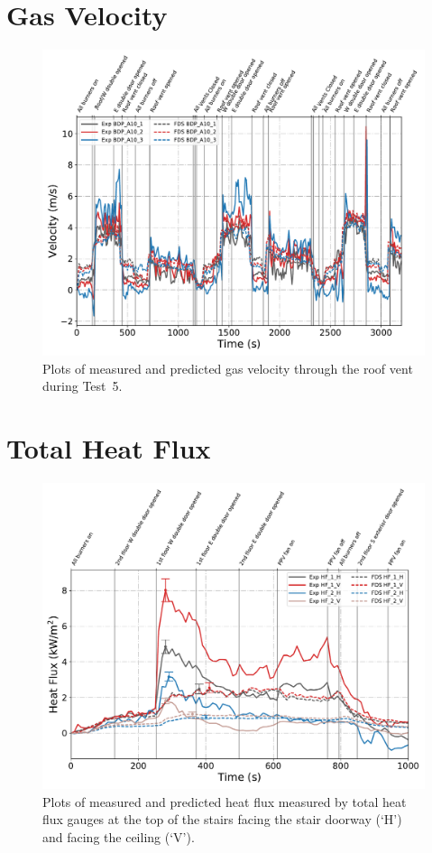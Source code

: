 \clearpage
\section{Gas Velocity}
\begin{figure}[!h]
	\centering
	\includegraphics[width=\columnwidth]{Figures/Plots/Validation/Velocity/Test_5_BDP_A10}
	\caption[Plots of measured and predicted gas velocity through the roof vent during Test~5.]{Plots of measured and predicted gas velocity through the roof vent during Test~5.}
	\label{fig:Test5_BDPs}
\end{figure}

\clearpage
\section{Total Heat Flux}
\begin{figure}[!h]
	\centering
	\includegraphics[width=\columnwidth]{Figures/Plots/Validation/Heat_Flux/Test_23_HFs}
	\caption[Plots of measured and predicted heat flux during Test~23.]{Plots of measured and predicted heat flux measured by total heat flux gauges at the top of the stairs facing the stair doorway (`H') and facing the ceiling (`V').}
	\label{fig:Test5_BDPs}
\end{figure}
